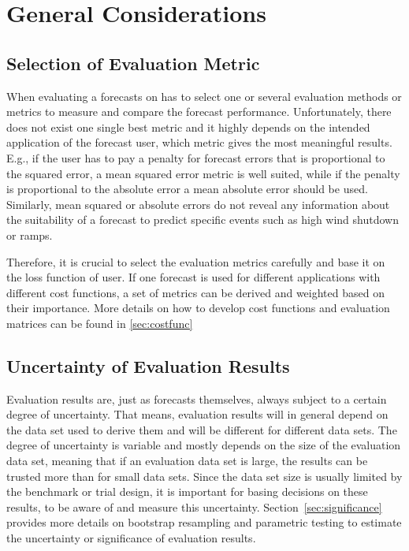  
\section{General Considerations}
\subsection{Selection of Evaluation Metric}
When evaluating a forecasts on has to select one or several evaluation methods or metrics to measure and compare the forecast performance. 
Unfortunately, there does not exist one single best metric and it highly depends on the intended application of the forecast user, which metric gives the most meaningful results.
E.g., if the user has to pay a penalty for forecast errors that is proportional to the squared error, a mean squared error metric is well suited, while if the penalty is proportional to the absolute error a mean absolute error should be used. Similarly, mean squared or absolute errors do not reveal any information about the suitability of a forecast to predict specific events such as high wind shutdown or ramps.

Therefore, it is crucial to select the evaluation metrics carefully and base it on the loss function of user. If one forecast is used for different applications with different cost functions, a set of metrics can be derived and weighted based on their importance.
More details on how to develop cost functions and evaluation matrices can be found in \ref{sec:costfunc}

\subsection{Uncertainty of Evaluation Results}\label{sec:uncertainty}

Evaluation results are, just as forecasts themselves, always subject to a certain degree of uncertainty. That means, evaluation results will in general depend on the data set used to derive them and will be different for different data sets.  
The degree of uncertainty is variable and mostly depends on the size of the evaluation data set, meaning that if an evaluation data set is large, the results can be trusted more than for small data sets.
Since the data set size is usually limited by the benchmark or trial design, it is important for basing decisions on these results, to be aware of and measure this uncertainty.
Section~\ref{sec:significance} provides more details on bootstrap resampling and parametric testing to estimate the uncertainty or significance of evaluation results.


